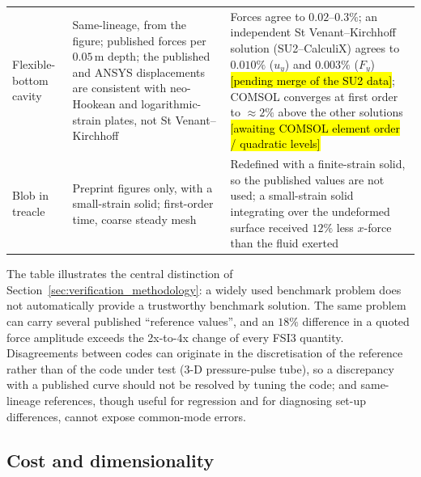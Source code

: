 \begin{table}[htbp]
\begin{tabular}{p{2.8cm}p{5.8cm}p{5.0cm}}
		Flexible-bottom cavity & Same-lineage, from the figure; published forces per $0.05\,\mathrm{m}$ depth; the published and ANSYS displacements are consistent with neo-Hookean and logarithmic-strain plates, not St Venant--Kirchhoff & Forces agree to $0.02$--$0.3\%$; an independent St Venant--Kirchhoff solution (SU2--CalculiX) agrees to $0.010\%$ ($u_y$) and $0.003\%$ ($F_y$) \hl{[pending merge of the SU2 data]}; COMSOL converges at first order to $\approx2\%$ above the other solutions \hl{[awaiting COMSOL element order / quadratic levels]} \\
		Blob in treacle & Preprint figures only, with a small-strain solid; first-order time, coarse steady mesh & Redefined with a finite-strain solid, so the published values are not used; a small-strain solid integrating over the undeformed surface received $12\%$ less $x$-force than the fluid exerted \\
		\bottomrule
	\end{tabular}
\end{table}

The table illustrates the central distinction of Section~\ref{sec:verification_methodology}: a widely used benchmark problem does not automatically provide a trustworthy benchmark solution.
The same problem can carry several published ``reference values'', and an $18\%$ difference in a quoted force amplitude exceeds the 2x-to-4x change of every FSI3 quantity.
Disagreements between codes can originate in the discretisation of the reference rather than of the code under test (3-D pressure-pulse tube), so a discrepancy with a published curve should not be resolved by tuning the code; and same-lineage references, though useful for regression and for diagnosing set-up differences, cannot expose common-mode errors.

\subsection{Cost and dimensionality}\label{sec:cost}

